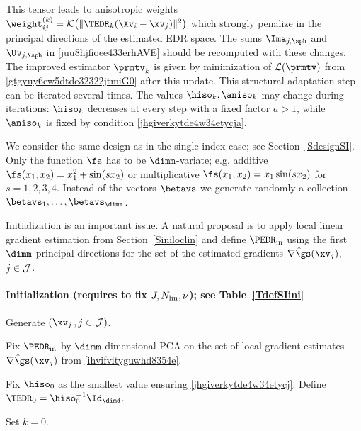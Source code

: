 This tensor leads to anisotropic weights 
\( \weight_{ij}^{(k)} = \Kern\bigl( \| \TEDR_{k}(\Xv_{i} - \xv_{j}) \|^{2} \bigr) \)
which strongly penalize in the principal directions of the estimated EDR space.
The sums \( \Ima_{j,\sph} \) and \( \Uv_{j,\sph} \) in \eqref{juu8hjfioee433erhAVE}
should be recomputed with these changes.
The improved estimator \( \prmtv_{k} \) is given by 
minimization of \( \LL(\prmtv) \) from \eqref{gtgyuy6ew5dtde32322jtmiG0}
after this update.
%
This structural adaptation step can be iterated several times.
The values \( \hiso_{k}, \aniso_{k} \) may change during iterations: 
\( \hiso_{k} \) decreases at every step with a fixed factor 
\( a > 1 \), while \( \aniso_{k} \) is fixed by condition \eqref{jhgiverkytde4w34etycja}.

\label{SEDRmiproc}

We consider the same design as in the single-index case; see Section~\ref{SdesignSI}.
Only the function \( \fs \) has to be \( \dimm \)-variate;
e.g. additive \( \fs(x_{1},x_{2}) = x_{1}^{2} + \sin(s x_{2}) \)
or multiplicative \( \fs(x_{1},x_{2}) = x_{1} \sin(s x_{2}) \) for \( s=1,2,3,4 \).
Instead of the vectors \( \betavs \) we generate randomly a collection 
\( \betavs_{1},\ldots,\betavs_{\dimm} \). 

Initialization is an important issue.
A natural proposal is to apply local linear gradient estimation
from Section~\ref{Siniloclin} and define 
\( \PEDR_{\init} \) using the first \( \dimm \) principal directions
for the set of the estimated gradients \( \hat{\nabla \gs}(\xv_{j}) \), \( j \in \mathcal{J} \).




\paragraph{Initialization (requires to fix \( J, N_{\operatorname{lin}}, \nu \)); see Table~\ref{TdefSIini}}
\begin{mylist}
\item
Generate \( (\xv_{j} \, , j \in \JJJ) \).

\item
Fix \( \PEDR_{\init} \) by \( \dimm \)-dimensional PCA on the set of local gradient estimates
\( \hat{\nabla \gs}(\xv_{j}) \) from \eqref{ihvifvityguwhd8354e}.


\item
Fix \( \hiso_{0} \) as the smallest value ensuring \eqref{jhgiverkytde4w34etycj}.
Define \( \TEDR_{0} = \hiso_{0}^{-1} \Id_{\dimd} \).

\item Set \( k=0 \).

\end{mylist}

